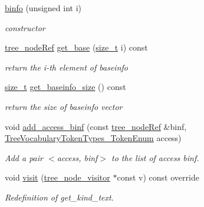 \begin{DoxyCompactItemize}
\item 
\hyperlink{structbinfo_a76ec269ad6525a9f2d6015973c1ee6c7}{binfo} (unsigned int i)
\begin{DoxyCompactList}\small\item\em constructor \end{DoxyCompactList}\item 
\hyperlink{tree__node_8hpp_a6ee377554d1c4871ad66a337eaa67fd5}{tree\+\_\+node\+Ref} \hyperlink{structbinfo_a373cb009bfbb00aac48ceb5c03fb72f1}{get\+\_\+base} (\hyperlink{tutorial__fpt__2017_2intro_2sixth_2test_8c_a7c94ea6f8948649f8d181ae55911eeaf}{size\+\_\+t} i) const
\begin{DoxyCompactList}\small\item\em return the i-\/th element of baseinfo \end{DoxyCompactList}\item 
\hyperlink{tutorial__fpt__2017_2intro_2sixth_2test_8c_a7c94ea6f8948649f8d181ae55911eeaf}{size\+\_\+t} \hyperlink{structbinfo_ac48ab2cc024529097997704729acccb3}{get\+\_\+baseinfo\+\_\+size} () const
\begin{DoxyCompactList}\small\item\em return the size of baseinfo vector \end{DoxyCompactList}\item 
void \hyperlink{structbinfo_a08b1511d43322ed78aa46f4b0b75dc31}{add\+\_\+access\+\_\+binf} (const \hyperlink{tree__node_8hpp_a6ee377554d1c4871ad66a337eaa67fd5}{tree\+\_\+node\+Ref} \&binf, \hyperlink{token__interface_8hpp_a14502d0757789149f644966ca931b126}{Tree\+Vocabulary\+Token\+Types\+\_\+\+Token\+Enum} access)
\begin{DoxyCompactList}\small\item\em Add a pair $<$access, binf$>$ to the list of access binf. \end{DoxyCompactList}\item 
void \hyperlink{structbinfo_adc2b24cc31b9f03ae787f9f625405883}{visit} (\hyperlink{classtree__node__visitor}{tree\+\_\+node\+\_\+visitor} $\ast$const v) const override
\begin{DoxyCompactList}\small\item\em Redefinition of get\+\_\+kind\+\_\+text. \end{DoxyCompactList}\end{DoxyCompactItemize}
